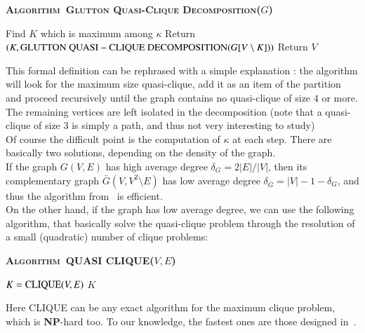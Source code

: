 \documentclass[preprint]{elsarticle}
\newcommand{\algo}[1]{\textsc{Algorithm~#1}}
\begin{document}
\begin{algorithm}[ht!]
\textbf{\algo{Glutton Quasi-Clique Decomposition}($G$)}
\label{algo:glutton}
\begin{algorithmic}[1]
        \STATE Find $K$ which is maximum among $\kappa$
        \STATE Return $(K,{\rm GLUTTON~QUASI-CLIQUE~DECOMPOSITION}(G[V\setminus K]))$
    \ELSE
    	\STATE Return $V$
    \ENDIF
\end{algorithmic}
\end{algorithm}

This formal definition can be rephrased with a simple explanation : the algorithm will look for the maximum size quasi-clique, add it as an item of the partition and proceed recursively until the graph contains no quasi-clique of size $4$ or more. The remaining vertices are left isolated in the decomposition (note that a quasi-clique of size $3$ is simply a path, and thus not very interesting to study)\\

Of course the difficult point is the computation of $\kappa$ at each step. There are basically two solutions, depending on the density of the graph.\\

If the graph $G(V,E)$ has high average degree $\delta_G = 2|E|/|V|$, then its complementary graph $\bar{G}(V,V^2\setminus E)$ has low average degree $\delta_{\bar{G}} = |V|-1-\delta_G$, and thus the algorithm from~\cite{qis} is efficient.\\

On the other hand, if the graph has low average degree, we can use the following algorithm, that basically solve the quasi-clique problem through the resolution of a small (quadratic) number of clique problems:

\begin{algorithm}[ht!]
\textbf{\algo{QUASI CLIQUE}($V,E$)}
\label{algo:param}
\begin{algorithmic}[1]
	\STATE $K = {\rm CLIQUE}(V,E)$
	\ENDFOR
	\RETURN $K$
\end{algorithmic}
\end{algorithm}

Here CLIQUE can be any exact algorithm for the maximum clique problem, which is \textbf{NP}-hard too. To our knowledge, the fastest ones are those designed in~\cite{exactis}.\\
\end{document}
